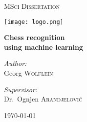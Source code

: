 \begin{titlepage}
	\centering
	
	{\scshape\LARGE MSci Dissertation\par}
	\vspace{0.25cm}
	{\texttt{[image: logo.png]} \par}
	\vspace{0.25cm}
	{\huge\bfseries Chess recognition\\using machine learning\par}
	\vspace{0.5cm}

	\vfill

	\noindent
	\begin{minipage}{0.45\textwidth}
		\begin{center} \large
		  \textit{Author:}\\
          Georg \textsc{Wölflein}\\
		\end{center}
    \end{minipage}%
    \begin{minipage}{0.45\textwidth}
		\begin{center} \large
		\textit{Supervisor:} \\
		Dr.~Ognjen \textsc{Arandjelović}
		\end{center}
	\end{minipage}%

	\vfill

	{\today\par}
\end{titlepage}
